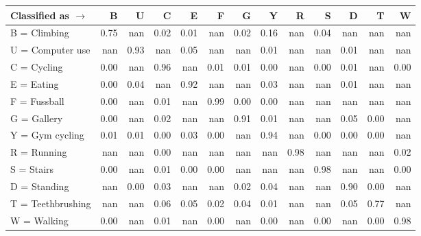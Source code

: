 \begin{tabular}{lrrrrrrrrrrrr}
\toprule
Classified as $\rightarrow$ &    B &    U &    C &    E &    F &    G &    Y &    R &    S &    D &    T &    W \\
\midrule
B = Climbing      & 0.75 &  nan & 0.02 & 0.01 &  nan & 0.02 & 0.16 &  nan & 0.04 &  nan &  nan &  nan \\
U = Computer use  &  nan & 0.93 &  nan & 0.05 &  nan &  nan & 0.01 &  nan &  nan & 0.01 &  nan &  nan \\
C = Cycling       & 0.00 &  nan & 0.96 &  nan & 0.01 & 0.01 & 0.00 &  nan & 0.00 & 0.01 &  nan & 0.00 \\
E = Eating        & 0.00 & 0.04 &  nan & 0.92 &  nan &  nan & 0.03 &  nan &  nan & 0.01 &  nan &  nan \\
F = Fussball      & 0.00 &  nan & 0.01 &  nan & 0.99 & 0.00 & 0.00 &  nan &  nan &  nan &  nan &  nan \\
G = Gallery       & 0.00 &  nan & 0.02 &  nan &  nan & 0.91 & 0.01 &  nan &  nan & 0.05 & 0.00 &  nan \\
Y = Gym cycling   & 0.01 & 0.01 & 0.00 & 0.03 & 0.00 &  nan & 0.94 &  nan & 0.00 & 0.00 & 0.00 &  nan \\
R = Running       &  nan &  nan & 0.00 &  nan &  nan &  nan &  nan & 0.98 &  nan &  nan &  nan & 0.02 \\
S = Stairs        & 0.00 &  nan & 0.01 & 0.00 & 0.00 &  nan &  nan &  nan & 0.98 &  nan &  nan & 0.00 \\
D = Standing      &  nan & 0.00 & 0.03 &  nan &  nan & 0.02 & 0.04 &  nan &  nan & 0.90 & 0.00 &  nan \\
T = Teethbrushing &  nan &  nan & 0.06 & 0.05 & 0.02 & 0.04 & 0.01 &  nan &  nan & 0.05 & 0.77 &  nan \\
W = Walking       & 0.00 &  nan & 0.01 &  nan & 0.00 &  nan & 0.00 &  nan & 0.00 &  nan & 0.00 & 0.98 \\
\bottomrule
\end{tabular}
